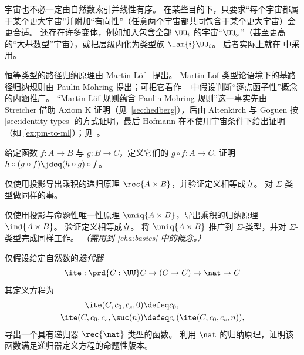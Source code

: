 宇宙也不必一定由自然数索引并线性有序。
在某些目的下，只要求“每个宇宙都属于某个更大宇宙”并附加“有向性”（任意两个宇宙都共同包含于某个更大宇宙）会更合适。
还存在许多变体，例如加入包含全部 $\UU_i$ 的宇宙“$\UU_{\omega}$”（甚至更高的“大基数型”宇宙），或把层级内化为类型族 $\lam{i} \UU_i$。
后者实际上就在 \Agda 中采用。

恒等类型的路径归纳原理由 Martin-L\"{o}f~\cite{Martin-Lof-1973} 提出。
Martin-L\"of 类型论语境下的基路径归纳规则由 Paulin-Mohring \cite{Moh93} 提出；可把它看作 \NuPRL~\cite[Section~8.1]{constable+86nuprl-book} 中假设判断“逐点函子性”概念的内涵推广。
“Martin-L\"of 规则蕴含 Paulin-Mohring 规则”这一事实先由 Streicher 借助 Axiom K 证明（见~\cref{sec:hedberg}），后由 Altenkirch 与 Goguen 按 \cref{sec:identity-types} 的方式证明，最后 Hofmann 在不使用宇宙条件下给出证明（如 \cref{ex:pm-to-ml}）；见~\cite[\S1.3 和 Addendum]{Streicher93}。

\sectionExercises

\begin{ex}\label{ex:composition}
  给定函数 $f:A\to B$ 与 $g:B\to C$，定义它们的
 $g\circ f:A\to C$.
  证明 $h \circ (g\circ f) \jdeq (h\circ g)\circ f$。
\end{ex}

\begin{ex}\label{ex:pr-to-rec}
  仅使用投影导出乘积的递归原理 $\rec{A\times B} $，并验证定义相等成立。
  对 $\Sigma$-类型做同样的事。
\end{ex}

\begin{ex}\label{ex:pr-to-ind}
  仅使用投影与命题性唯一性原理 $\uniq{A\times B}$，导出乘积的归纳原理 $\ind{A\times B}$。
  验证定义相等成立。
  将 $\uniq{A\times B}$ 推广到 $\Sigma$-类型，并对 $\Sigma$-类型完成同样工作。
  \emph{（需用到 \cref{cha:basics} 中的概念。）}
\end{ex}

\begin{ex}\label{ex:iterator}
仅假设给定自然数的\emph{迭代器}
\[\ite : \prd{C:\UU} C \to (C \to C) \to \nat \to C \]
其定义方程为
\begin{align*}
\ite(C,c_0,c_s,0)  &\defeq c_0, \\
\ite(C,c_0,c_s,\suc(n)) &\defeq c_s(\ite(C,c_0,c_s,n)),
\end{align*}
导出一个具有递归器 $\rec{\nat}$ 类型的函数。
利用 $\nat$ 的归纳原理，证明该函数满足递归器定义方程的命题性版本。
\end{ex}

